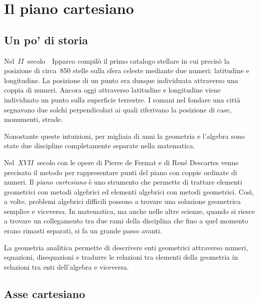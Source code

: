 


\chapter{Il piano cartesiano}

\section{Un po' di storia}
\label{sec:01_storia}

Nel~$II$~secolo~\aC\ Ipparco compilò il primo catalogo stellare in cui 
precisò la posizione di circa~850 stelle sulla sfera celeste mediante due 
numeri: latitudine e longitudine. La posizione di un punto era dunque 
individuata attraverso una coppia di numeri.
Ancora oggi attraverso latitudine e longitudine viene individuato un punto 
sulla superficie terrestre.
I romani nel fondare una città segnavano due solchi perpendicolari ai quali 
riferivano la posizione di case, monumenti, strade.

Nonostante queste intuizioni, per migliaia di anni la geometria e l'algebra 
sono state due discipline completamente separate nella matematica.

Nel~$XVII$~secolo con le opere di Pierre de Fermat e di René Descartes 
venne precisato il metodo per rappresentare punti del piano con coppie 
ordinate di numeri. 
Il \emph{piano cartesiano} è uno strumento che permette di trattare elementi 
geometrici con metodi algebrici ed elementi algebrici con metodi geometrici.
Così, a volte,  problemi algebrici difficili possono a trovare una soluzione 
geometrica semplice e viceversa.
In matematica, ma anche nelle altre scienze, quando si riesce a trovare un 
collegamento tra due rami della disciplina che fino a quel momento erano
rimasti separati, si fa un grande passo avanti.

La geometria analitica permette di descrivere enti geometrici attraverso 
numeri, equazioni, disequazioni e tradurre le relazioni tra elementi della 
geometria in relazioni tra enti dell'algebra e viceversa.

\section{Asse cartesiano}
\label{sec:02_asse}


